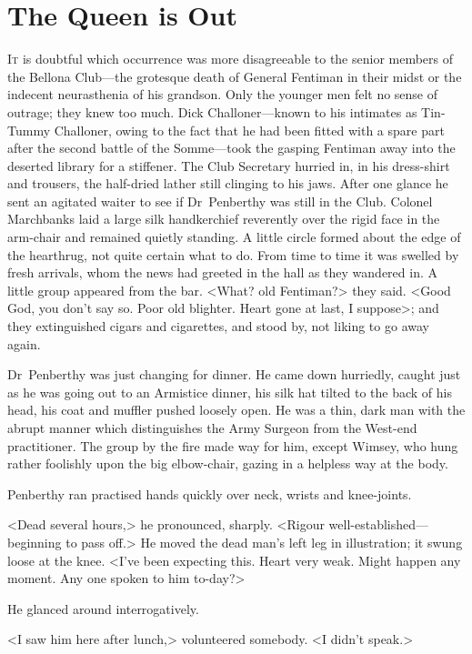 \chapter{The Queen is Out}
\lettrine{I}{t} is doubtful which occurrence was more disagreeable to the senior members of the Bellona Club—the grotesque death of General Fentiman in their midst or the indecent neurasthenia of his grandson. Only the younger men felt no sense of outrage; they knew too much. Dick Challoner—known to his intimates as Tin-Tummy Challoner, owing to the fact that he had been fitted with a spare part after the second battle of the Somme—took the gasping Fentiman away into the deserted library for a stiffener. The Club Secretary hurried in, in his dress-shirt and trousers, the half-dried lather still clinging to his jaws. After one glance he sent an agitated waiter to see if Dr~Penberthy was still in the Club. Colonel Marchbanks laid a large silk handkerchief reverently over the rigid face in the arm-chair and remained quietly standing. A little circle formed about the edge of the hearthrug, not quite certain what to do. From time to time it was swelled by fresh arrivals, whom the news had greeted in the hall as they wandered in. A little group appeared from the bar. <What? old Fentiman?> they said. <Good God, you don't say so. Poor old blighter. Heart gone at last, I suppose>; and they extinguished cigars and cigarettes, and stood by, not liking to go away again.

Dr~Penberthy was just changing for dinner. He came down hurriedly, caught just as he was going out to an Armistice dinner, his silk hat tilted to the back of his head, his coat and muffler pushed loosely open. He was a thin, dark man with the abrupt manner which distinguishes the Army Surgeon from the West-end practitioner. The group by the fire made way for him, except Wimsey, who hung rather foolishly upon the big elbow-chair, gazing in a helpless way at the body.

Penberthy ran practised hands quickly over neck, wrists and knee-joints.

<Dead several hours,> he pronounced, sharply. <Rigour well-established—beginning to pass off.> He moved the dead man's left leg in illustration; it swung loose at the knee. <I've been expecting this. Heart very weak. Might happen any moment. Any one spoken to him to-day?>

He glanced around interrogatively.

<I saw him here after lunch,> volunteered somebody. <I didn't speak.>

